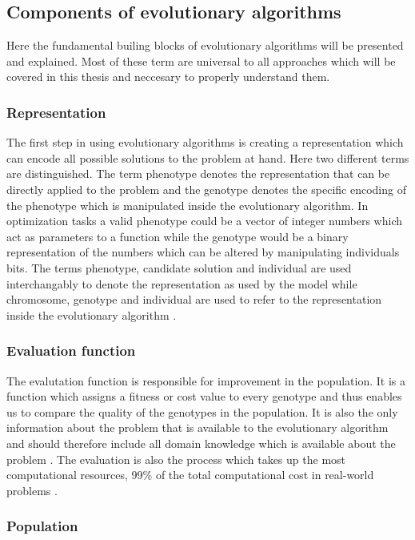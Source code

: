\subsection{Components of evolutionary algorithms}

Here the fundamental builing blocks of evolutionary algorithms will be presented and explained. Most of these term are universal to all approaches which will be covered in this thesis and neccesary to properly understand them.

\subsubsection{Representation}

The first step in using evolutionary algorithms is creating a representation which can encode all possible solutions to the problem at hand. Here two different terms are distinguished. The term phenotype denotes the representation that can be directly applied to the problem and the genotype denotes the specific encoding of the phenotype which is manipulated inside the evolutionary algorithm. In optimization tasks a valid phenotype could be a vector of integer numbers which act as parameters to a function while the genotype would be a binary representation of the numbers which can be altered by manipulating individuals bits. The terms phenotype, candidate solution and individual are used interchangably to denote the representation as used by the model while chromosome, genotype and individual are used to refer to the representation inside the evolutionary algorithm \cite{Eiben2015_whatevolutionary}.

\subsubsection{Evaluation function}

The evalutation function is responsible for improvement in the population. It is a function which assigns a fitness or cost value to every genotype and thus enables us to compare the quality of the genotypes in the population. It is also the only information about the problem that is available to the evolutionary algorithm and should therefore include all domain knowledge which is available about the problem \cite{Eiben2015_whatevolutionary}. The evaluation is also the process which takes up the most computational resources, 99\% of the total computational cost in real-world problems \cite{Eiben20021}.

\subsubsection{Population}

